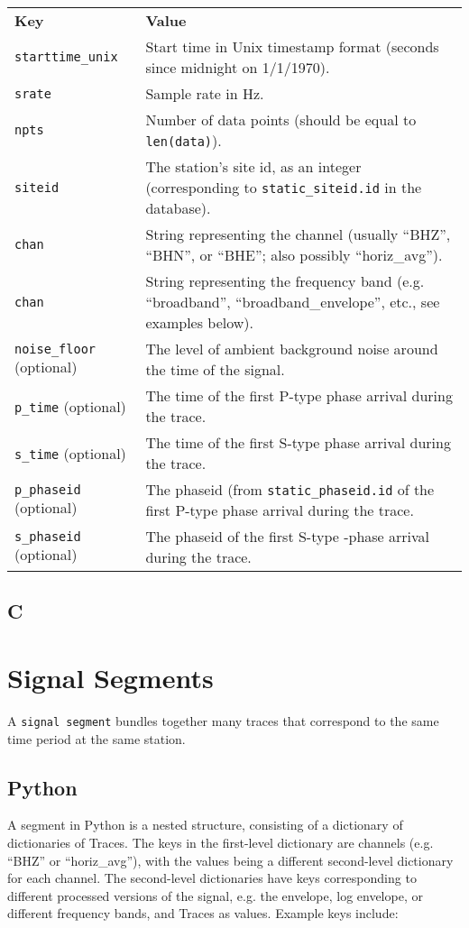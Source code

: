 \documentclass{article}
\begin{document}
\begin{tabular}{lp{4in}}
{\bf Key} & {\bf Value}\\
{\tt starttime\_unix} & Start time in Unix timestamp format (seconds since midnight on 1/1/1970). \\
{\tt srate} & Sample rate in Hz.\\
{\tt npts} & Number of data points (should be equal to {\tt len(data)}). \\
{\tt siteid} & The station's site id, as an integer (corresponding to {\tt static\_siteid.id} in the database).\\
{\tt chan} & String representing the channel (usually ``BHZ'', ``BHN'', or ``BHE''; also possibly ``horiz\_avg'').\\
{\tt chan} & String representing the frequency band (e.g. ``broadband'', ``broadband\_envelope'', etc., see examples below).\\
{\tt noise\_floor} (optional) & The level of ambient background noise around the time of the signal. \\
{\tt p\_time} (optional) & The time of the first P-type phase arrival during the trace.\\
{\tt s\_time} (optional) & The time of the first S-type phase arrival during the trace.\\
{\tt p\_phaseid} (optional) & The phaseid (from {\tt static\_phaseid.id} of the first P-type phase arrival during the trace.\\
{\tt s\_phaseid} (optional) & The phaseid of the first S-type -phase arrival during the trace.
\end{tabular}

\subsection{C}


\section{Signal Segments}

A {\tt signal segment} bundles together many traces that correspond to the same time period at the same station. 

\subsection{Python}

A segment in Python is a nested structure, consisting of a dictionary of dictionaries of Traces. The keys in the first-level dictionary are channels (e.g. ``BHZ'' or ``horiz\_avg''), with the values being a different second-level dictionary for each channel. The second-level dictionaries have keys corresponding to different processed versions of the signal, e.g. the envelope, log envelope, or different frequency bands, and Traces as values. Example keys include:
\end{document}
